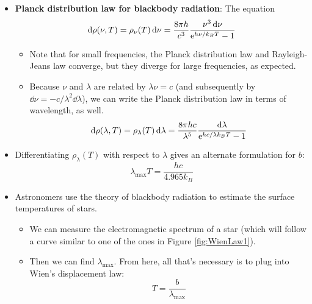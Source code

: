 \documentclass[../notes.tex]{subfiles}
\begin{document}
\begin{itemize}
    \item \textbf{Planck distribution law for blackbody radiation}: The equation
    \begin{equation*}
        \dd{\rho(\nu,T)} = \rho_\nu(T)\dd{\nu} = \frac{8\pi h}{c^3}\frac{\nu^3\dd{\nu}}{\e[h\nu/k_BT]-1}
    \end{equation*}
    \begin{itemize}
        \item Note that for small frequencies, the Planck distribution law and Rayleigh-Jeans law converge, but they diverge for large frequencies, as expected.
        \item Because $\nu$ and $\lambda$ are related by $\lambda\nu=c$ (and subsequently by $\dd{\nu}=-c/\lambda^2\dd{\lambda}$), we can write the Planck distribution law in terms of wavelength, as well.
        \begin{equation*}
            \dd{\rho(\lambda,T)} = \rho_\lambda(T)\dd{\lambda} = \frac{8\pi hc}{\lambda^5}\frac{\dd{\lambda}}{\e[hc/\lambda k_BT]-1}
        \end{equation*}
    \end{itemize}
    \item Differentiating $\rho_\lambda(T)$ with respect to $\lambda$ gives an alternate formulation for $b$:
    \begin{equation*}
        \lambda_\text{max}T = \frac{hc}{4.965k_B}
    \end{equation*}
    \item Astronomers use the theory of blackbody radiation to estimate the surface temperatures of stars.
    \begin{itemize}
        \item We can measure the electromagnetic spectrum of a star (which will follow a curve similar to one of the ones in Figure \ref{fig:WienLaw1}).
        \item Then we can find $\lambda_\text{max}$. From here, all that's necessary is to plug into Wien's displacement law:
        \begin{equation*}
            T = \frac{b}{\lambda_\text{max}}
        \end{equation*}
    \end{itemize}
\end{itemize}
\end{document}
